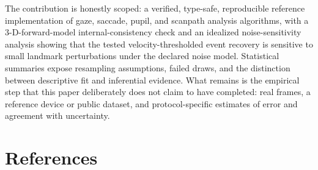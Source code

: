\documentclass[
]{article}
\begin{document}
The contribution is honestly scoped: a verified, type-safe, reproducible
reference implementation of gaze, saccade, pupil, and scanpath analysis
algorithms, with a 3-D-forward-model internal-consistency check and an
idealized noise-sensitivity analysis showing that the tested
velocity-thresholded event recovery is sensitive to small landmark
perturbations under the declared noise model. Statistical summaries
expose resampling assumptions, failed draws, and the distinction between
descriptive fit and inferential evidence. What remains is the empirical
step that this paper deliberately does not claim to have completed: real
frames, a reference device or public dataset, and protocol-specific
estimates of error and agreement with uncertainty.

\section{References}\label{sec:references}
\end{document}
